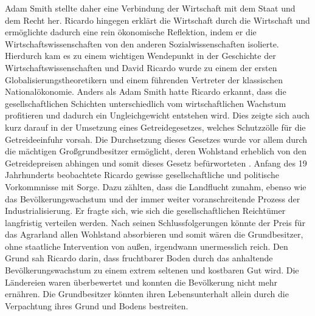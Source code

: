 \newline Adam Smith stellte daher eine Verbindung der Wirtschaft mit dem Staat und dem Recht her. Ricardo hingegen erkl{\"a}rt die Wirtschaft durch die Wirtschaft und ermöglichte dadurch eine rein {\"o}konomische Reflektion, indem er die Wirtschaftswissenschaften von den anderen Sozialwissenschaften isolierte. Hierdurch kam es zu einem wichtigen Wendepunkt in der Geschichte der Wirtschaftswissenschaften und David Ricardo wurde zu einem der ersten Globalisierungstheoretikern und einem f{\"u}hrenden Vertreter der klassischen National{\"o}konomie. \newline Anders als Adam Smith hatte Ricardo erkannt, dass die gesellschaftlichen Schichten unterschiedlich vom wirtschaftlichen Wachstum profitieren und dadurch ein Ungleichgewicht entstehen wird. Dies zeigte sich auch kurz darauf in der Umsetzung eines Getreidegesetzes, welches Schutzz{\"o}lle f{\"u}r die Getreideeinfuhr vorsah. Die Durchsetzung dieses Gesetzes wurde vor allem durch die m{\"a}chtigen Gro{\ss}grundbesitzer erm{\"o}glicht, deren Wohlstand erheblich von den Getreidepreisen abhingen und somit dieses Gesetz bef{\"u}rworteten \citep{Kurz.2008}.
\newline Anfang des 19 Jahrhunderts beobachtete Ricardo gewisse gesellschaftliche und politische Vorkommnisse mit Sorge. Dazu zählten, dass die Landflucht zunahm, ebenso wie das Bev{\"o}lkerungswachstum und der immer weiter voranschreitende Prozess der Industrialisierung. Er fragte sich, wie sich die gesellschaftlichen Reicht{\"u}mer langfristig verteilen werden. Nach seinen Schlussfolgerungen k{\"o}nnte der Preis f{\"u}r das Agrarland allen Wohlstand absorbieren und somit w{\"a}ren die Grundbesitzer, ohne staatliche Intervention von au{\ss}en, irgendwann unermesslich reich. Den Grund sah Ricardo darin, dass fruchtbarer Boden durch das anhaltende Bev{\"o}lkerungswachstum zu einem extrem seltenen und kostbaren Gut wird. Die L{\"a}ndereien waren {\"u}berbewertet und konnten die Bev{\"o}lkerung nicht mehr ern{\"a}hren. Die Grundbesitzer k{\"o}nnten ihren Lebensunterhalt allein durch die Verpachtung ihres Grund und Bodens bestreiten. \newline


